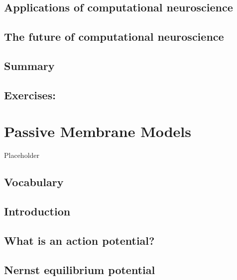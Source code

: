 \documentclass[
]{book}
\begin{document}
\hypertarget{applications-of-computational-neuroscience}{%
\section{Applications of computational neuroscience}\label{applications-of-computational-neuroscience}}

\hypertarget{the-future-of-computational-neuroscience}{%
\section{The future of computational neuroscience}\label{the-future-of-computational-neuroscience}}

\hypertarget{summary}{%
\section{Summary}\label{summary}}

\hypertarget{exercises}{%
\section{Exercises:}\label{exercises}}

\hypertarget{Ch3}{%
\chapter{Passive Membrane Models}\label{Ch3}}

Placeholder

\hypertarget{vocabulary}{%
\section{Vocabulary}\label{vocabulary}}

\hypertarget{introduction}{%
\section{Introduction}\label{introduction}}

\hypertarget{what-is-an-action-potential}{%
\section{What is an action potential?}\label{what-is-an-action-potential}}

\hypertarget{nernst-equilibrium-potential}{%
\section{Nernst equilibrium potential}\label{nernst-equilibrium-potential}}
\end{document}
